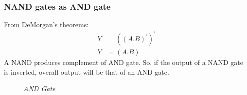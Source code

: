 		\subsubsection{NAND gates as AND gate}
			From DeMorgan’s theorems:
			\begin{align*}
				Y &= ((A.B)^\prime)^\prime \\
				Y &= (A.B)				
			\end{align*}
			A NAND produces complement of AND gate. So, if the output of a NAND gate is inverted, overall output will be that of an AND gate.
			\begin{figure}[ht]
				\centering
				\hfill
				\caption{\textit{AND Gate}}
			\end{figure}
			
